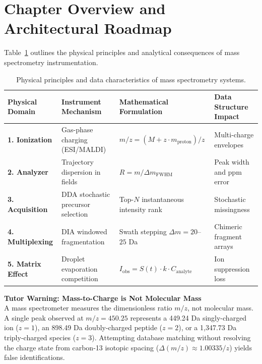 \documentclass[11pt,twoside,openright]{book}
\begin{document}
\vspace{1em}
\section*{Chapter Overview and Architectural Roadmap}

Table~\ref{tab:ms_physics_roadmap} outlines the physical principles and analytical consequences of mass spectrometry instrumentation.

\begin{table}[htbp]
\centering
\caption{Physical principles and data characteristics of mass spectrometry systems.}
\label{tab:ms_physics_roadmap}
\small
\begin{tabularx}{\textwidth}{>{\raggedright\arraybackslash}l >{\raggedright\arraybackslash}p{4.2cm} >{\raggedright\arraybackslash}X >{\raggedright\arraybackslash}p{2.8cm}}
\toprule
\textbf{Physical Domain} & \textbf{Instrument Mechanism} & \textbf{Mathematical Formulation} & \textbf{Data Structure Impact} \\
\midrule
\textbf{1. Ionization} & Gas-phase charging (ESI/MALDI) \cite{fenn1989electrospray, karas1988laser} & $m/z = (M + z \cdot m_{\text{proton}})/z$ & Multi-charge envelopes \\
\addlinespace
\textbf{2. Analyzer} & Trajectory dispersion in fields \cite{makarov2000orbitrap, guilhaus1995principles} & $R = m / \Delta m_{\text{FWHM}}$ \cite{zubarev2007persistent} & Peak width and ppm error \\
\addlinespace
\textbf{3. Acquisition} & DDA stochastic precursor selection \cite{michalski2011more} & Top-$N$ instantaneous intensity rank \cite{domon2010options} & Stochastic missingness \\
\addlinespace
\textbf{4. Multiplexing} & DIA windowed fragmentation \cite{gillet2012targeted} & Swath stepping $\Delta m = 20$--$25$ Da & Chimeric fragment arrays \cite{demichev2020dia} \\
\addlinespace
\textbf{5. Matrix Effect} & Droplet evaporation competition \cite{king2000mechanisms} & $I_{\text{obs}} = S(t) \cdot k \cdot C_{\text{analyte}}$ & Ion suppression loss \cite{annesley2003ion} \\
\bottomrule
\end{tabularx}
\end{table}

\begin{notebox}
\textbf{Tutor Warning: Mass-to-Charge is Not Molecular Mass}\\[0.4em]
A mass spectrometer measures the dimensionless ratio $m/z$, not molecular mass. A single peak observed at $m/z = 450.25$ represents a 449.24 Da singly-charged ion ($z=1$), an 898.49 Da doubly-charged peptide ($z=2$), or a 1,347.73 Da triply-charged species ($z=3$). Attempting database matching without resolving the charge state from carbon-13 isotopic spacing ($\Delta(m/z) \approx 1.00335/z$) yields false identifications.
\end{notebox}
\end{document}
